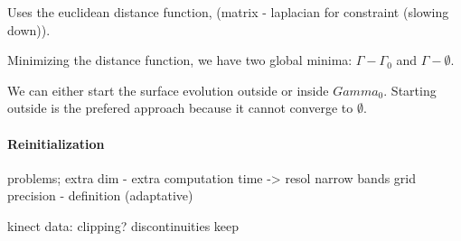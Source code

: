 \documentclass{article}
\begin{document}
Uses the euclidean distance function, (matrix - laplacian for constraint (slowing down)).

Minimizing the distance function, we have two global minima: $\Gamma - \Gamma_0$ and $\Gamma - 	\emptyset$.

We can either start the surface evolution outside or inside $Gamma_0$. Starting outside is the prefered approach because it cannot converge to $\emptyset$.

\paragraph{Reinitialization}


problems;
extra dim - extra computation time -> resol narrow bands
grid precision - definition (adaptative)

kinect data:
clipping?
discontinuities keep
\end{document}
